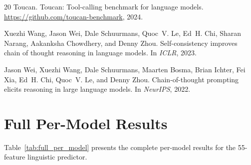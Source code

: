 \documentclass{article}
\begin{document}
\begin{thebibliography}{20}
Toucan.
\newblock Toucan: Tool-calling benchmark for language models.
\newblock \url{https://github.com/toucan-benchmark}, 2024.

Xuezhi Wang, Jason Wei, Dale Schuurmans, Quoc~V. Le, Ed~H. Chi, Sharan Narang, Aakanksha Chowdhery, and Denny Zhou.
\newblock Self-consistency improves chain of thought reasoning in language models.
\newblock In \emph{ICLR}, 2023.

Jason Wei, Xuezhi Wang, Dale Schuurmans, Maarten Bosma, Brian Ichter, Fei Xia, Ed~H. Chi, Quoc~V. Le, and Denny Zhou.
\newblock Chain-of-thought prompting elicits reasoning in large language models.
\newblock In \emph{NeurIPS}, 2022.

\end{thebibliography}


\newpage
\appendix
\section{Full Per-Model Results}
\label{app:full_results}

Table~\ref{tab:full_per_model} presents the complete per-model results for the 55-feature linguistic predictor.
\end{document}
